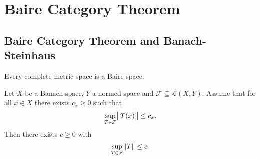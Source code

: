 \section{Baire Category Theorem}
\subsection{Baire Category Theorem and Banach-Steinhaus}
\begin{theorem}
	Every complete metric space is a Baire space.
\end{theorem}

\begin{theorem}
	Let $X$ be a Banach space, $Y$ a normed space and $\mathcal{F} \subseteq \mathcal{L}(X,Y)$. Assume that for all $x \in X$ there exists $c_x \geq 0$ such that 
	\begin{equation}
		\sup_{T \in \mathcal{F}}\norm{T(x)} \leq c_x.
	\end{equation}
	\noindent Then there exists $c \geq 0$ with
	\begin{equation}
		\sup_{T \in \mathcal{F}} \norm{T} \leq c.
	\end{equation}
\end{theorem}
